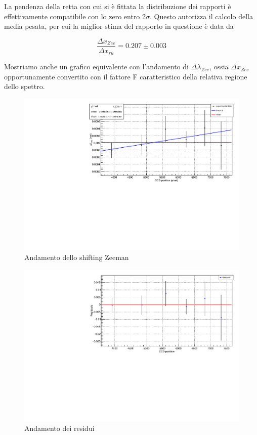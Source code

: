 \documentclass{article}
\begin{document}
	La pendenza della retta con cui si è fittata la distribuzione dei rapporti è effettivamente
	compatibile con lo zero entro 2$\sigma$. Questo autorizza il calcolo della media pesata, per cui 
	la miglior stima del rapporto in questione è data da 

	\[
		\frac{\Delta x_{Zee}}{\Delta x_{ru}} = 0.207 \pm 0.003	
	\]

	Mostriamo anche un grafico equivalente con l'andamento di $\Delta\lambda_{Zee}$, ossia 
	$\Delta x_{Zee}$ opportunamente convertito con il fattore F caratteristico della relativa regione
	dello spettro.

	\begin{center}
		\begin{figure}[H]
			\centering
			\includegraphics[scale=0.38, angle=0]{campomin/dlambdazee.pdf}
			\setlength{\belowcaptionskip}{-20pt}
			\caption{Andamento dello shifting Zeeman}
			\label{fig:fit_dlambdazee_min}
		\end{figure}
	\end{center}

	\begin{center}
		\begin{figure}[H]
			\centering
			\includegraphics[scale=0.38, angle=0]{campomin/residuals.pdf}
			\setlength{\belowcaptionskip}{-20pt}
			\caption{Andamento dei residui}
			\label{fig:fit_dlambdazee_min_res}
		\end{figure}
	\end{center}
\end{document}
